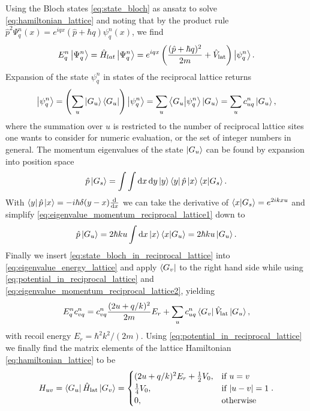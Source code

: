 Using the Bloch states \cref{eq:state_bloch} as ansatz to solve
\cref{eq:hamiltonian_lattice} and noting that by the product rule
$\hat{p}^2\Psi^n_q(x)=e^{iqx}(\hat{p}+\hbar q)\psi^n_q(x)$, we find
\begin{equation}
  E^n_q\ket{\Psi^n_{q}}
  =\hat{H}_{lat}\ket{\Psi^n_{q}}
  =e^{iqx}\left(\frac{(\hat{p}+\hbar q)^2}{2m}+\hat{V}_\text{lat}\right)\ket{\psi^n_{q}}
  \label{eq:eigenvalue_energy_lattice}.
\end{equation}
Expansion of the state $\psi^n_q$ in states of the reciprocal lattice returns
\begin{equation}
  \ket{\psi^n_q}
  =\left(\sum_u\ket{G_u}\bra{G_u}\right)\ket{\psi^n_q}
  =\sum_u \braket{G_u}{\psi^n_q}\ket{G_u}
  =\sum_u c^n_{uq}\ket{G_u}
  \label{eq:state_bloch_in_reciprocal_lattice},
\end{equation}
where the summation over $u$ is restricted to the number of reciprocal
lattice sites one wants to consider for numeric evaluation, or the set of
integer numbers in general. The momentum eigenvalues of the state $\ket{G_u}$
can be found by expansion into position space
\begin{equation}
  \hat{p}\ket{G_s}
  =\int\int\dd{x}\dd{y}\ket{y}\bra{y}\hat{p}\ket{x}\bra{x}\ket{G_s}
  \label{eq:eigenvalue_momentum_reciprocal_lattice1}.
\end{equation}
With $\bra{y}\hat{p}\ket{x}=-i\hbar\delta(y-x)\dv{x}$ we can take the
derivative of $\bra{x}\ket{G_s}=e^{2ikxu}$ and simplify
\cref{eq:eigenvalue_momentum_reciprocal_lattice1} down to
\begin{equation}
  \hat{p}\ket{G_u}
  =2\hbar ku\int\dd{x}\ket{x}\bra{x}\ket{G_u}
  =2\hbar ku\ket{G_u}
  \label{eq:eigenvalue_momentum_reciprocal_lattice2}.
\end{equation}
Finally we insert \cref{eq:state_bloch_in_reciprocal_lattice} into
\cref{eq:eigenvalue_energy_lattice} and apply $\bra{G_v}$ to the
right hand side while using \cref{eq:potential_in_reciprocal_lattice} and
\cref{eq:eigenvalue_momentum_reciprocal_lattice2}, yielding
\begin{equation}
  E^n_qc^n_{vq}
  =c^n_{vq}
  \frac{(2u+q/k)^2}{2m}E_r+
  \sum_u c^n_{uq}\bra{G_v}\hat{V}_\text{lat}\ket{G_u}
  \label{eq:eigenvalue_energy_lattice_explicit},
\end{equation}
with recoil energy $E_r=\hbar^2k^2/(2m)$. Using
\cref{eq:potential_in_reciprocal_lattice} we finally find the matrix elements
of the lattice Hamiltonian \cref{eq:hamiltonian_lattice} to be
\begin{equation}
  H_{uv}
  =\bra{G_u}\hat{H}_\text{lat}\ket{G_v}
  =\begin{cases}
    (2u+q/k)^2E_r+\frac{1}{2}V_0, & \text{if }u=v\\
    \frac{1}{4}V_0, & \text{if } \abs{u-v}=1\\
    0, & \text{otherwise}
  \end{cases}
  \label{eq:hamiltonian_lattice_elements}.
\end{equation}
